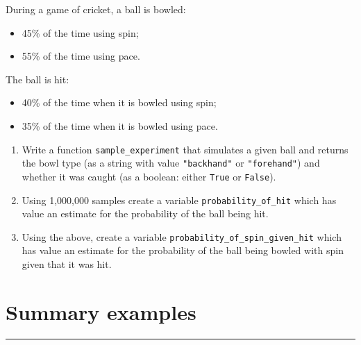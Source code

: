 \documentclass{article}
\begin{document}
During a game of cricket, a ball is bowled:

\begin{itemize}
    \item 45\% of the time using spin;
    \item 55\% of the time using pace.
\end{itemize}

The ball is hit:

\begin{itemize}
    \item 40\% of the time when it is bowled using spin;
    \item 35\% of the time when it is bowled using pace.
\end{itemize}

\begin{enumerate}
    \item Write a function \texttt{sample_experiment} that simulates a given ball
        and returns the bowl type (as a string with value
        \texttt{"backhand"} or
        \texttt{"forehand"}) and whether it was caught (as a
        boolean: either \texttt{True} or \texttt{False}).
    \item Using 1,000,000 samples create a variable
        \texttt{probability_of_hit} which
        has value an estimate for the probability of the ball being hit.
    \item Using the above, create a variable
        \texttt{probability_of_spin_given_hit} which has value an estimate for the
        probability of the ball being bowled with spin given that it
        was hit.
\end{enumerate}


\section{Summary examples}
\hrule
\end{document}
